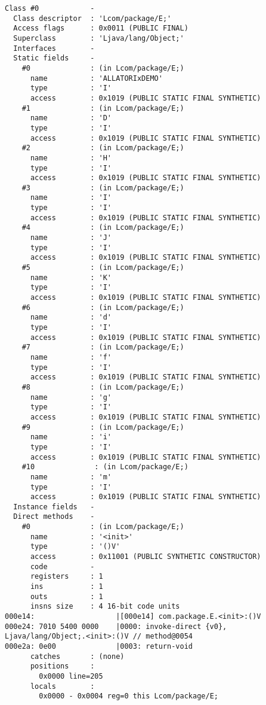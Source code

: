 \begin{lstlisting}
Class #0            -
  Class descriptor  : 'Lcom/package/E;'
  Access flags      : 0x0011 (PUBLIC FINAL)
  Superclass        : 'Ljava/lang/Object;'
  Interfaces        -
  Static fields     -
    #0              : (in Lcom/package/E;)
      name          : 'ALLATORIxDEMO'
      type          : 'I'
      access        : 0x1019 (PUBLIC STATIC FINAL SYNTHETIC)
    #1              : (in Lcom/package/E;)
      name          : 'D'
      type          : 'I'
      access        : 0x1019 (PUBLIC STATIC FINAL SYNTHETIC)
    #2              : (in Lcom/package/E;)
      name          : 'H'
      type          : 'I'
      access        : 0x1019 (PUBLIC STATIC FINAL SYNTHETIC)
    #3              : (in Lcom/package/E;)
      name          : 'I'
      type          : 'I'
      access        : 0x1019 (PUBLIC STATIC FINAL SYNTHETIC)
    #4              : (in Lcom/package/E;)
      name          : 'J'
      type          : 'I'
      access        : 0x1019 (PUBLIC STATIC FINAL SYNTHETIC)
    #5              : (in Lcom/package/E;)
      name          : 'K'
      type          : 'I'
      access        : 0x1019 (PUBLIC STATIC FINAL SYNTHETIC)
    #6              : (in Lcom/package/E;)
      name          : 'd'
      type          : 'I'
      access        : 0x1019 (PUBLIC STATIC FINAL SYNTHETIC)
    #7              : (in Lcom/package/E;)
      name          : 'f'
      type          : 'I'
      access        : 0x1019 (PUBLIC STATIC FINAL SYNTHETIC)
    #8              : (in Lcom/package/E;)
      name          : 'g'
      type          : 'I'
      access        : 0x1019 (PUBLIC STATIC FINAL SYNTHETIC)
    #9              : (in Lcom/package/E;)
      name          : 'i'
      type          : 'I'
      access        : 0x1019 (PUBLIC STATIC FINAL SYNTHETIC)
    #10              : (in Lcom/package/E;)
      name          : 'm'
      type          : 'I'
      access        : 0x1019 (PUBLIC STATIC FINAL SYNTHETIC)
  Instance fields   -
  Direct methods    -
    #0              : (in Lcom/package/E;)
      name          : '<init>'
      type          : '()V'
      access        : 0x11001 (PUBLIC SYNTHETIC CONSTRUCTOR)
      code          -
      registers     : 1
      ins           : 1
      outs          : 1
      insns size    : 4 16-bit code units
000e14:                   |[000e14] com.package.E.<init>:()V
000e24: 7010 5400 0000    |0000: invoke-direct {v0}, Ljava/lang/Object;.<init>:()V // method@0054
000e2a: 0e00              |0003: return-void
      catches       : (none)
      positions     :
        0x0000 line=205
      locals        :
        0x0000 - 0x0004 reg=0 this Lcom/package/E;


\end{lstlisting}
